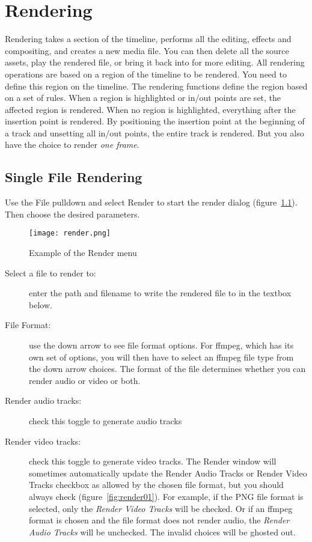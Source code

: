 \chapter{Rendering}%
\label{cha:rendering}

Rendering takes a section of the timeline, performs all the editing,
effects and compositing, and creates a new media file.  You can then
delete all the source assets, play the rendered file, or bring it
back into \CGG{} for more editing.  All rendering operations are
based on a region of the timeline to be rendered.  You need to
define this region on the timeline.  The rendering functions define
the region based on a set of rules.  When a region is highlighted or
in/out points are set, the affected region is rendered.  When no
region is highlighted, everything after the insertion point is
rendered.  By positioning the insertion point at the beginning of a
track and unsetting all in/out points, the entire track is rendered.
But you also have the choice to render \textit{one frame}.

\section{Single File Rendering}%
\label{sec:single_file_rendering}

Use the File pulldown and select Render to start the render dialog
(figure~\ref{fig:render}).  Then choose the desired parameters.

\begin{figure}[htpb] \centering
  \texttt{[image: render.png]}
  \caption{Example of the Render menu}
  \label{fig:render}
\end{figure}

\begin{description}
\item[Select a file to render to:] enter the path and filename to
  write the rendered file to in the textbox below.
\item[File Format:] use the down arrow to see file format options.
  For ffmpeg, which has its own set of options, you will then have to
  select an ffmpeg file type from the down arrow choices. The format
  of the file determines whether you can render audio or video or
  both.
\item[Render audio tracks:] check this toggle to generate audio
  tracks
\item[Render video tracks:] check this toggle to generate video
  tracks. The Render window will sometimes automatically update the
  Render Audio Tracks or Render Video Tracks checkbox as allowed by
  the chosen file format, but you should always check
  (figure~\ref{fig:render01}).  For example, if the PNG file format is
  selected, only the \textit{Render Video Tracks} will be checked.  Or
  if an ffmpeg format is chosen and the file format does not render
  audio, the \textit{Render Audio Tracks} will be unchecked. The
  invalid choices will be ghosted out.
\end{description}

